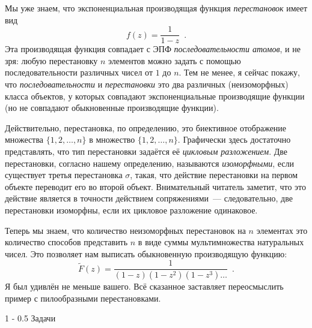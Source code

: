\documentclass{article}
\makeatletter
\theoremstyle{definition}
\renewcommand{\section}{\@startsection
{section}%
{1}%
{\z@}%
{-\baselineskip}%
{0.5\baselineskip}%
{\centering\large\scshape}} %
\makeatother
\begin{document}
Мы уже знаем, что экспоненциальная производящая функция \textit{перестановок} 
имеет вид
\[
	f(z) = \dfrac{1}{1 - z} \enspace .
\]
Эта производящая функция совпадает с ЭПФ \textit{последовательности атомов}, и 
не зря: любую перестановку \( n \) элементов можно задать с помощью 
последовательности различных чисел от \( 1 \) до \( n \). Тем не менее, я 
сейчас покажу, что \textit{последовательности} и \textit{перестановки} это два 
различных (неизоморфных) класса объектов, у которых совпадают экспоненциальные 
производящие функции (но не совпадают обыкновенные производящие функции).

Действительно, перестановка, по определению, это биективное отображение 
множества \( \{ 1, 2, \ldots, n \} \) в множество \( \{ 1, 2, \ldots, n \} \). 
Графически здесь достаточно представлять, что тип перестановки задаётся её 
\textit{цикловым разложением}. Две перестановки, согласно нашему определению, 
называются \textit{изоморфными}, если существует третья перестановка \( \sigma 
\), такая, что действие перестановки на первом объекте переводит его во второй 
объект. Внимательный читатель заметит, что это действие является в точности 
действием сопряжениями~--- следовательно, две перестановки изоморфны, если их 
цикловое разложение одинаковое.

Теперь мы знаем, что количество неизоморфных перестановок на \( n \) элементах 
это количество способов представить \( n \) в виде суммы мультимножества 
натуральных чисел. Это позволяет нам выписать обыкновенную производящую функцию:
\[
	\widetilde{F}(z) = \dfrac{1}{(1-z)(1-z^2)(1-z^3) \ldots} \enspace .
\]
Я был удивлён не меньше вашего. Всё сказанное заставляет переосмыслить пример с 
пилообразными перестановками.

\section{Задачи}
\end{document}
